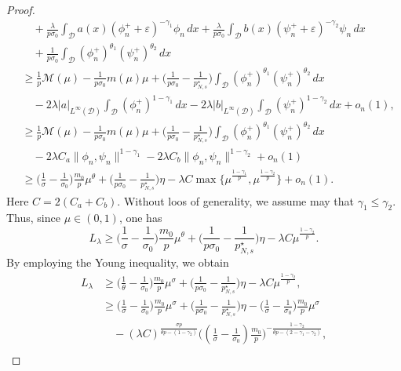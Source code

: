 \documentclass[reqno]{amsart}
\begin{document}
\begin{proof}
\begin{equation}
\begin{aligned}
&\quad+\frac{\lambda}{p\sigma_0}\int_\mathcal{D} a(x)(\phi_n^++\varepsilon)^{-\gamma_1}\phi_n\,dx+\frac{\lambda}{p\sigma_0}\int_\mathcal{D}b(x)(\psi_n^++\varepsilon)^{-\gamma_2}\psi_n\,dx \\
&\quad+\frac{1}{p\sigma_0}\int_\mathcal{D}(\phi_n^+)^{\theta_1}(\psi_n^+)^{\theta_2}\,dx \\
&\geq\frac{1}{p}\mathscr{M}(\mu)-\frac{1}{p\sigma_0}m(\mu)\mu+\Big(\frac{1}{p\sigma_0}-\frac{1}{p^\star_{N,s}}\Big)\int_\mathcal{D}(\phi_n^+)^{\theta_1}(\psi_n^+)^{\theta_2}\,dx \\
&\quad-2\lambda|a|_{L^\infty(\mathcal{D})} \int_\mathcal{D} (\phi_n^+)^{1-\gamma_1}\,dx-2\lambda|b|_{L^\infty(\mathcal{D})} \int_\mathcal{D} (\psi_n^+)^{1-\gamma_2}\,dx+o_n(1), \\
&\geq\frac{1}{p}\mathscr{M}(\mu)-\frac{1}{p\sigma_0}m(\mu)\mu+\Big(\frac{1}{p\sigma_0}-\frac{1}{p^\star_{N,s}}\Big)\int_\mathcal{D}(\phi_n^+)^{\theta_1}(\psi_n^+)^{\theta_2}\,dx \\
&\quad-2\lambda C_a \| \phi_n,\psi_n\|^{1-\gamma_1}-2\lambda C_b \| \phi_n,\psi_n\|^{1-\gamma_2}+o_n(1) \\
&\geq\Big(\frac{1}{\sigma}-\frac{1}{\sigma_0}\Big)\frac{m_0}{p}\mu^\theta+\Big(\frac{1}{p\sigma_0}-\frac{1}{p^\star_{N,s}}\Big)\eta-\lambda C \max\lbrace \mu^\frac{1-\gamma_1}{p},\mu^\frac{1-\gamma_2}{p} \rbrace+o_n(1).
\end{aligned}
\end{equation}
Here $C=2(C_a+C_b)$. Without loos of generality, we assume may that
$\gamma_1\leq \gamma_2$. Thus, since $\mu\in (0,1)$, one has
\[
L_\lambda\geq\Big(\frac{1}{\sigma}-\frac{1}{\sigma_0}\Big)
\frac{m_0}{p}\mu^\theta+\Big(\frac{1}{p\sigma_0}
-\frac{1}{p^\star_{N,s}}\Big)\eta-\lambda C \mu^\frac{1-\gamma_2}{p} .
\]
By employing the Young inequality, we obtain
\begin{align*}
L_\lambda
&\geq \Big(\frac{1}{\theta}-\frac{1}{\sigma_0}\Big)
 \frac{m_0}{p}\mu^\sigma+\Big(\frac{1}{p\sigma_0}-\frac{1}{p^\star_{N,s}}\Big)\eta-\lambda C\mu^\frac{1-\gamma_2}{p},\\
&\geq \Big(\frac{1}{\sigma}-\frac{1}{\sigma_0}\Big)
 \frac{m_0}{p}\mu^\sigma+\Big(\frac{1}{p\sigma_0}-\frac{1}{p^\star_{N,s}}\Big)\eta-\Big(\frac{1}{\sigma}-\frac{1}{\sigma_0}\Big)\frac{m_0}{p}\mu^\sigma\\
&\quad -( \lambda C)^\frac{\sigma p}{\theta p-(1-\gamma_2)}
 \Big((\frac{1}{\sigma}-\frac{1}{\sigma_0})\frac{m_0}{p}\Big)^{-\frac{1-\gamma_2}{\theta p-(2-\gamma_1-\gamma_2)}} ,\\

\end{align*}
\end{proof}
\end{document}
